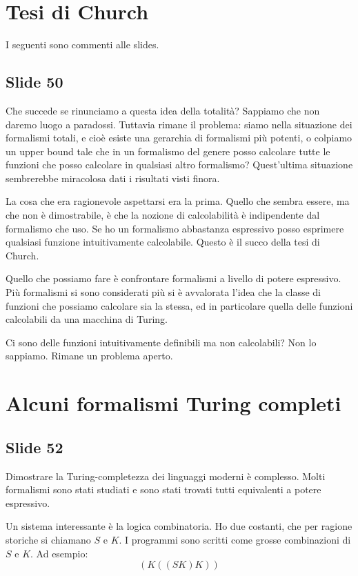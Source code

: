 \section{Tesi di Church}

I seguenti sono commenti alle slides.

\subsection{Slide 50}

Che succede se rinunciamo a questa idea della totalità? Sappiamo che non daremo luogo a paradossi.
Tuttavia rimane il problema: siamo nella situazione dei formalismi totali, e cioè esiste una
gerarchia di formalismi più potenti, o colpiamo un upper bound tale che in un formalismo del genere
posso calcolare tutte le funzioni che posso calcolare in qualsiasi altro formalismo?  Quest'ultima
situazione sembrerebbe miracolosa dati i risultati visti finora.

La cosa che era ragionevole aspettarsi era la prima. Quello che sembra essere, ma che non è
dimostrabile, è che la nozione di calcolabilità è indipendente dal formalismo che uso. Se ho un
formalismo abbastanza espressivo posso esprimere qualsiasi funzione intuitivamente calcolabile.
Questo è il succo della tesi di Church.

Quello che possiamo fare è confrontare formalismi a livello di potere espressivo. Più formalismi
si sono considerati più si è avvalorata l'idea che la classe di funzioni che possiamo calcolare sia
la stessa, ed in particolare quella delle funzioni calcolabili da una macchina di Turing.

Ci sono delle funzioni intuitivamente definibili ma non calcolabili? Non lo sappiamo. Rimane un
problema aperto.

\section{Alcuni formalismi Turing completi}

\subsection{Slide 52}

Dimostrare la Turing-completezza dei linguaggi moderni è complesso. Molti formalismi sono stati
studiati e sono stati trovati tutti equivalenti a potere espressivo.

Un sistema interessante è la logica combinatoria. Ho due costanti, che per ragione storiche si
chiamano $S$ e $K$. I programmi sono scritti come grosse combinazioni di $S$ e $K$. Ad esempio:
\begin{equation*}
    (K ((S K) K))
\end{equation*}

